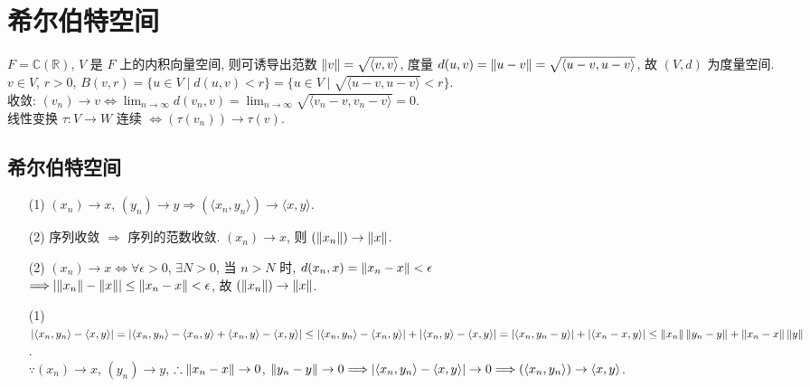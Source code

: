 \documentclass{note}
\begin{document}
\fi
\chapter{希尔伯特空间}
$F=\mathbb{C}(\mathbb{R})$, $V$ 是 $F$ 上的内积向量空间, 则可诱导出范数 $\left\lVert v\right\rVert=\sqrt{\langle v,v\rangle}$, 度量 $d(u,v)=\left\lVert u-v\right\rVert=\sqrt{\langle u-v,u-v\rangle}$, 故 $(V,d)$ 为度量空间.\\
$v\in V$, $r>0$, $B(v,r)=\{u\in V\mid d(u,v)<r\}=\{u\in V\mid\sqrt{\langle u-v,u-v\rangle}<r\}$.\\
收敛: $(v_n)\rightarrow v\Longleftrightarrow\lim_{n\rightarrow\infty}d(v_n,v)=\lim_{n\rightarrow\infty}\sqrt{\langle v_n-v,v_n-v\rangle}=0$.\\
线性变换 $\tau:V\rightarrow W$ 连续 $\Longleftrightarrow(\tau(v_n))\rightarrow\tau(v)$.

\section{希尔伯特空间}
\begin{thm}[(课本定理 13.5)]
    \begin{itemize}
        \item[(1)] $(x_n)\rightarrow x$, $(y_n)\rightarrow y\Longrightarrow(\langle x_n,y_n\rangle)\rightarrow\langle x,y\rangle$.
        \item[(2)] 序列收敛 $\Longrightarrow$ 序列的范数收敛. $(x_n)\rightarrow x$, 则 $(\left\lVert x_n\right\rVert)\rightarrow\left\lVert x\right\rVert$.
    \end{itemize}
\end{thm}
\begin{pf}
    \begin{itemize}
        \item[(2)] $(x_n)\rightarrow x\Longleftrightarrow\forall\epsilon>0$, $\exists N>0$, 当 $n>N$ 时, $d(x_n,x)=\left\lVert x_n-x\right\rVert<\epsilon$\\
        $\Longrightarrow\left\lvert\left\lVert x_n\right\rVert-\left\lVert x\right\rVert\right\rvert\leq\left\lVert x_n-x\right\rVert<\epsilon$, 故 $(\left\lVert x_n\right\rVert)\rightarrow\left\lVert x\right\rVert$.
        \item[(1)] $\left\lvert\langle x_n,y_n\rangle-\langle x,y\rangle\right\rvert=\left\lvert\langle x_n,y_n\rangle-\langle x_n,y\rangle+\langle x_n,y\rangle-\langle x,y\rangle\right\rvert\leq\left\lvert\langle x_n,y_n\rangle-\langle x_n,y\rangle\right\rvert+\left\lvert\langle x_n,y\rangle-\langle x,y\rangle\right\rvert=\left\lvert\langle x_n,y_n-y\rangle\right\rvert+\left\lvert\langle x_n-x,y\rangle\right\rvert\leq\left\lVert x_n\right\rVert\left\lVert y_n-y\right\rVert+\left\lVert x_n-x\right\rVert\left\lVert y\right\rVert$.\\
        $\because(x_n)\rightarrow x$, $(y_n)\rightarrow y$, $\therefore\left\lVert x_n-x\right\rVert\rightarrow 0$, $\left\lVert y_n-y\right\rVert\rightarrow 0\Longrightarrow\left\lvert\langle x_n,y_n\rangle-\langle x,y\rangle\right\rvert\rightarrow 0\Longrightarrow(\langle x_n,y_n\rangle)\rightarrow\langle x,y\rangle$.
    \end{itemize}
\end{pf}
\end{document}
